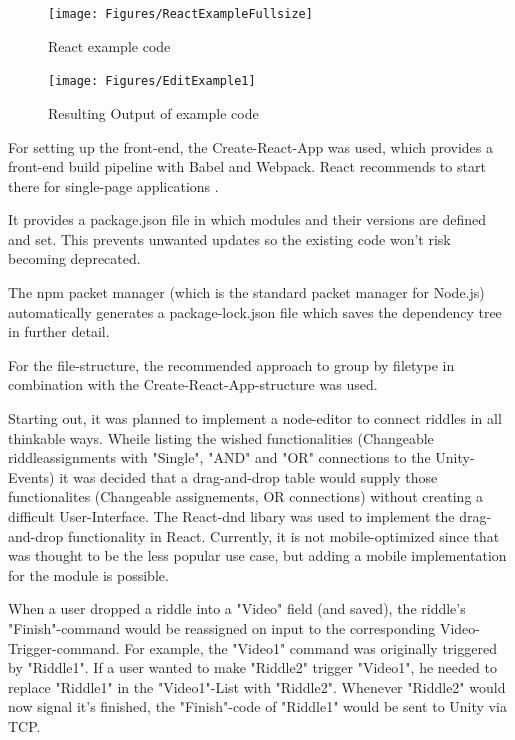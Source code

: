 \begin{figure}[b]
	\centering
    \texttt{[image: Figures/ReactExampleFullsize]}
	\decoRule
	\caption[React1]{React example code}
	\label{fig:reactEx}
\end{figure}


\begin{figure}[t]
    \centering
	\texttt{[image: Figures/EditExample1]}
	\decoRule
	\caption[ReactEx]{Resulting Output of example code}
	\label{fig:resultReact}
\end{figure}


For setting up the front-end, the Create-React-App was used, which provides a front-end build pipeline with Babel and Webpack.
React recommends to start there for single-page applications \parencite{createReactApp}.

It provides a package.json file in which modules and their versions are defined and set.
This prevents unwanted updates so the existing code won't risk becoming deprecated.

The npm packet manager (which is the standard packet manager for Node.js) automatically generates a package-lock.json file which saves the dependency tree in further detail.

For the file-structure, the recommended approach to group by filetype \parencite{reactStructure} in combination with the Create-React-App-structure was used.

Starting out, it was planned to implement a node-editor to connect riddles in all thinkable ways.
Wheile listing the wished functionalities (Changeable riddleassignments with "Single", "AND" and "OR" connections to the Unity-Events) it was decided that a drag-and-drop table would supply those functionalites (Changeable assignements, OR connections) without creating a difficult User-Interface.
The React-dnd libary \parencite{reactDND} was used to implement the drag-and-drop functionality in React. 
Currently, it is not mobile-optimized since that was thought to be the less popular use case, but adding a mobile implementation for the module is possible.

When a user dropped a riddle into a "Video" field (and saved), the riddle's "Finish"-command would be reassigned on input to the corresponding Video-Trigger-command.
For example, the "Video1" command was originally triggered by "Riddle1".
If a user wanted to make "Riddle2" trigger "Video1", he needed to replace "Riddle1" in the "Video1"-List with "Riddle2".
Whenever "Riddle2" would now signal it's finished, the "Finish"-code of "Riddle1" would be sent to Unity via TCP.

